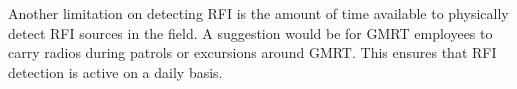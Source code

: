 \documentclass[a4paper,12pt]{article}
\begin{document}
Another limitation on detecting RFI is the amount of time available to physically detect RFI sources in the field. A suggestion would be for GMRT employees to carry radios during patrols or excursions around GMRT. This ensures that RFI detection is active on a daily basis. 
                                                                                                                                                                                                                                                                                                                                                                                                                                                                                                                                                                                                                                                                                                                                                                                                                                                                                                                                                                                                                                                                                                                                                                                                                                                                                                                                                                                                                                                                                                                                                                                                                                                                                                                                                                                                                                                                                                                                                                                                                                                                                                                                                                                                                                                                                                                                                                                                                                                                                                                                                                                                                                                                                                                                                                                                                                                                                                                                                                                                                                                                                                                                                                                     
\end{document}
